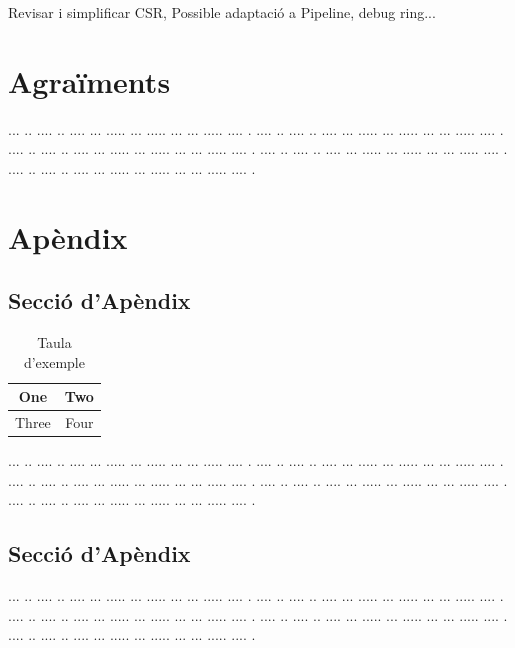 \documentclass[10pt,a4paper,twocolumn,twoside]{article}
\begin{document}
Revisar i simplificar CSR, Possible adaptació a Pipeline, debug ring...
    
    



\section*{Agraïments}

... ..  .... .. .... ... ..... ... ..... ... ... ..... .... .
.... ..  .... .. .... ... ..... ... ..... ... ... ..... .... .
.... ..  .... .. .... ... ..... ... ..... ... ... ..... .... .
.... ..  .... .. .... ... ..... ... ..... ... ... ..... .... .
.... ..  .... .. .... ... ..... ... ..... ... ... ..... .... .










\appendix

\section*{Apèndix}

\setcounter{section}{1}

\subsection{Secció d'Apèndix}
\begin{table}[h]
\caption{Taula d'exemple}
\label{tab:senzilla}
\begin{center}
\begin{tabular}{|c|c|}
\hline
One & Two\\
\hline
Three & Four\\
\hline
\end{tabular}
\end{center}
\end{table}

... ..  .... .. .... ... ..... ... ..... ... ... ..... .... .
.... ..  .... .. .... ... ..... ... ..... ... ... ..... .... .
.... ..  .... .. .... ... ..... ... ..... ... ... ..... .... .
.... ..  .... .. .... ... ..... ... ..... ... ... ..... .... .
.... ..  .... .. .... ... ..... ... ..... ... ... ..... .... .

\subsection{Secció d'Apèndix}


... ..  .... .. .... ... ..... ... ..... ... ... ..... .... .
.... ..  .... .. .... ... ..... ... ..... ... ... ..... .... .
.... ..  .... .. .... ... ..... ... ..... ... ... ..... .... .
.... ..  .... .. .... ... ..... ... ..... ... ... ..... .... .
.... ..  .... .. .... ... ..... ... ..... ... ... ..... .... .
\end{document}
